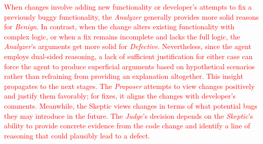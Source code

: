 \documentclass[authoryear,final,5p,times,twocolumn]{elsarticle}
\theoremstyle{plain}
\begin{document}
\textcolor{red}{
When changes involve adding new functionality or developer's attempts to fix a previously buggy functionality, the \emph{Analyzer} generally provides more solid reasons for \emph{Benign}. In contrast, when the change alters existing functionality with complex logic, or when a fix remains incomplete and lacks the full logic, the \emph{Analyzer}'s arguments get more solid for \emph{Defective}. Nevertheless, since the agent employs dual-sided reasoning, a lack of sufficient justification for either case can force the agent to produce superficial arguments based on hypothetical scenarios rather than refraining from providing an explanation altogether.
This insight propagates to the next stages. The \emph{Proposer} attempts to view changes positively and justify them favorably; for fixes, it aligns the changes with developer's comments. Meanwhile, the Skeptic views changes in terms of what potential bugs they may introduce in the future. The \emph{Judge}’s decision depends on the \emph{Skeptic}’s ability to provide concrete evidence from the code change and identify a line of reasoning that could plausibly lead to a defect.}
\end{document}
